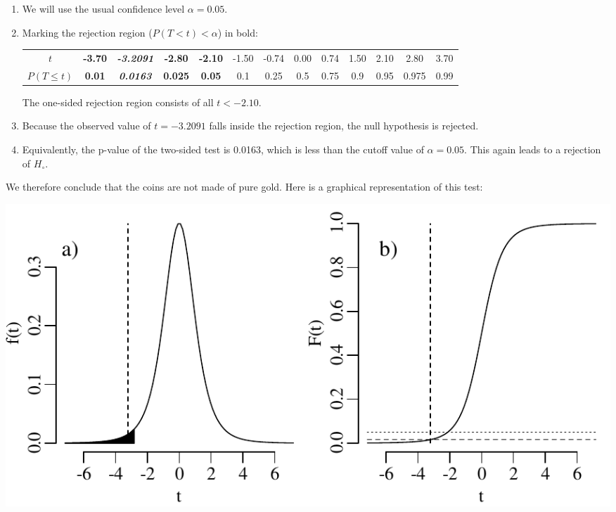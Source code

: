 \begin{enumerate}
\item We will use the usual confidence level $\alpha = 0.05$.

\item Marking the rejection region ($P(T<t)<\alpha$) in bold:
  
  \begin{center}
    \begin{tabular}{c|c@{\gap}c@{\gap}c@{\gap}c@{\gap}
        c@{\gap}c@{\gap}c@{\gap}c@{\gap}c@{\gap}c@{\gap}c@{\gap}c}
      $t$ & \textbf{-3.70} & \textbf{\emph{-3.2091}} & \textbf{-2.80} &
      \textbf{-2.10} & -1.50 & -0.74 & 0.00 & 0.74 & 1.50 & 2.10 & 2.80 & 3.70 \\
      $P(T\leq{t})$ & \textbf{0.01} & \textbf{\emph{0.0163}} & \textbf{0.025} &
      \textbf{0.05} & 0.1 & 0.25 & 0.5 & 0.75 & 0.9 &
      0.95 & 0.975 & 0.99
    \end{tabular}
  \end{center}

  The one-sided rejection region consists of all $t<-2.10$.

\item Because the observed value of $t=-3.2091$ falls inside the
  rejection region, the null hypothesis is rejected.

\item Equivalently, the p-value of the two-sided test is 0.0163, which
  is less than the cutoff value of $\alpha=0.05$. This again leads to
  a rejection of $H_\circ$.
  
\end{enumerate}

We therefore conclude that the coins are not made of pure gold. Here
is a graphical representation of this test:

\noindent\begin{minipage}[t][][b]{.6\textwidth}
  \includegraphics[width=\textwidth]{../figures/1samplettest.pdf}\\
\end{minipage}
\begin{minipage}[t][][t]{.4\textwidth}
  \label{fig:1samplettest}
\end{minipage}

